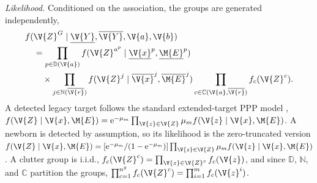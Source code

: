 \emph{Likelihood.} Conditioned on the association, the groups are generated independently,
\begin{equation}
\begin{aligned}
&f(\V{Z}^{G}\mid\underline{\V{Y}},\overline{\V{Y}},\V{a},\V{b})\\
&\quad=\prod_{p\in\mathbb{D}(\V{a})} f(\V{Z}^{a^{p}}\mid\underline{\V{x}}^{p},\underline{\M{E}}^{p})\\
&\qquad\times\prod_{j\in\mathbb{N}(\overline{\V{r}})} f(\V{Z}^{j}\mid\overline{\V{x}}^{j},\overline{\M{E}}^{j})
\prod_{c\in\mathbb{C}(\V{a},\overline{\V{r}})} f_c(\V{Z}^{c}).
\end{aligned}
\label{eq:pt_group_like_count_split}
\end{equation}
A detected legacy target follows the standard extended-target \ac{PPP} model \cite[Eq.~(24)]{Yuxuanxia_standardmodel}, \(f(\V{Z}\mid\V{x},\M{E})=\mathrm e^{-\mu_m}\prod_{\V{z}\in\V{Z}}\mu_m f(\V{z}\mid\V{x},\M{E})\). A newborn is detected by assumption, so its likelihood is the zero-truncated version \(f(\V{Z}\mid\V{x},\M{E})=[\mathrm e^{-\mu_m}/(1-\mathrm e^{-\mu_m})]\prod_{\V{z}\in\V{Z}}\mu_m f(\V{z}\mid\V{x},\M{E})\). A clutter group is i.i.d., \(f_c(\V{Z}^{c})=\prod_{\V{z}\in\V{Z}^{c}}f_c(\V{z})\), and since \(\mathbb{D}\), \(\mathbb{N}\), and \(\mathbb{C}\) partition the groups, \(\prod_{c=1}^{n^g}f_c(\V{Z}^{c})=\prod_{i=1}^{m}f_c(\V{z}^{i})\).


